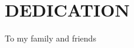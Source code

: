 %
%
%

\chapter*{DEDICATION}
\label{sec:dedication}




\indent                                                         To my family and friends



\pagebreak{}
